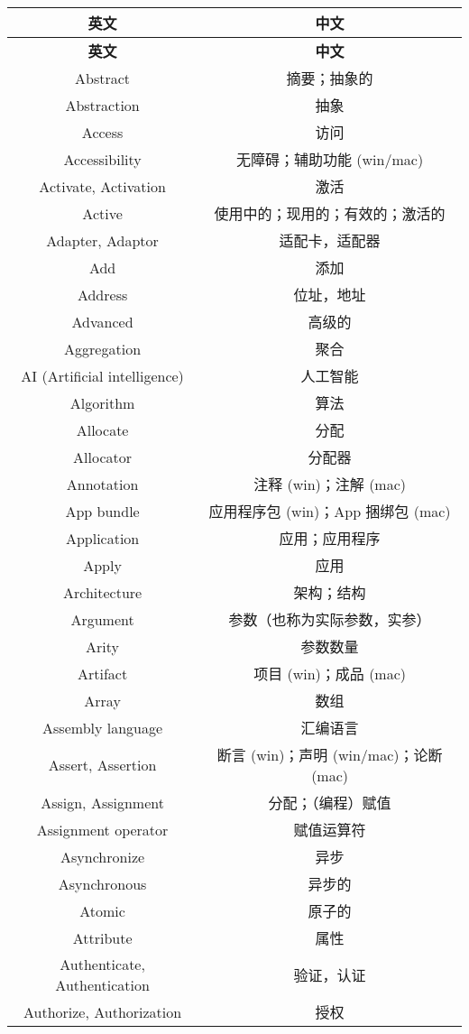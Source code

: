 \documentclass[report,oneside,UTF8,zihao=-4]{config}
\begin{document}
\begin{center}
    \begin{longtable}{|c|c|}
        \hline
        \textbf{英文} & \textbf{中文} \\
        \hline
    \endfirsthead
        \hline
        \textbf{英文} & \textbf{中文} \\
        \hline
    \endhead
        \hline
    \endfoot 
    \endlastfoot
        Abstract & 摘要；抽象的 \\ 
        Abstraction & 抽象 \\ 
        Access & 访问 \\ 
        Accessibility & 无障碍；辅助功能 (win/mac) \\ 
        Activate, Activation & 激活 \\ 
        Active & 使用中的；现用的；有效的；激活的 \\ 
        Adapter, Adaptor & 适配卡，适配器 \\ 
        Add & 添加 \\ 
        Address & 位址，地址 \\ 
        Advanced & 高级的 \\ 
        Aggregation & 聚合 \\ 
        AI (Artificial intelligence) & 人工智能 \\ 
        Algorithm & 算法 \\ 
        Allocate & 分配 \\ 
        Allocator & 分配器 \\ 
        Annotation & 注释 (win)；注解 (mac) \\ 
        App bundle & 应用程序包 (win)；App 捆绑包 (mac) \\ 
        Application & 应用；应用程序 \\ 
        Apply & 应用 \\ 
        Architecture & 架构；结构 \\ 
        Argument & 参数（也称为实际参数，实参） \\ 
        Arity & 参数数量 \\ 
        Artifact & 项目 (win)；成品 (mac) \\ 
        Array & 数组 \\ 
        Assembly language & 汇编语言 \\ 
        Assert, Assertion & 断言 (win)；声明 (win/mac)；论断 (mac) \\ 
        Assign, Assignment & 分配；（编程）赋值 \\ 
        Assignment operator & 赋值运算符 \\ 
        Asynchronize & 异步 \\ 
        Asynchronous & 异步的 \\ 
        Atomic & 原子的 \\ 
        Attribute & 属性 \\ 
        Authenticate, Authentication & 验证，认证 \\ 
        Authorize, Authorization & 授权 \\ 
        \hline
    \end{longtable}
    
\end{center}
\end{document}
